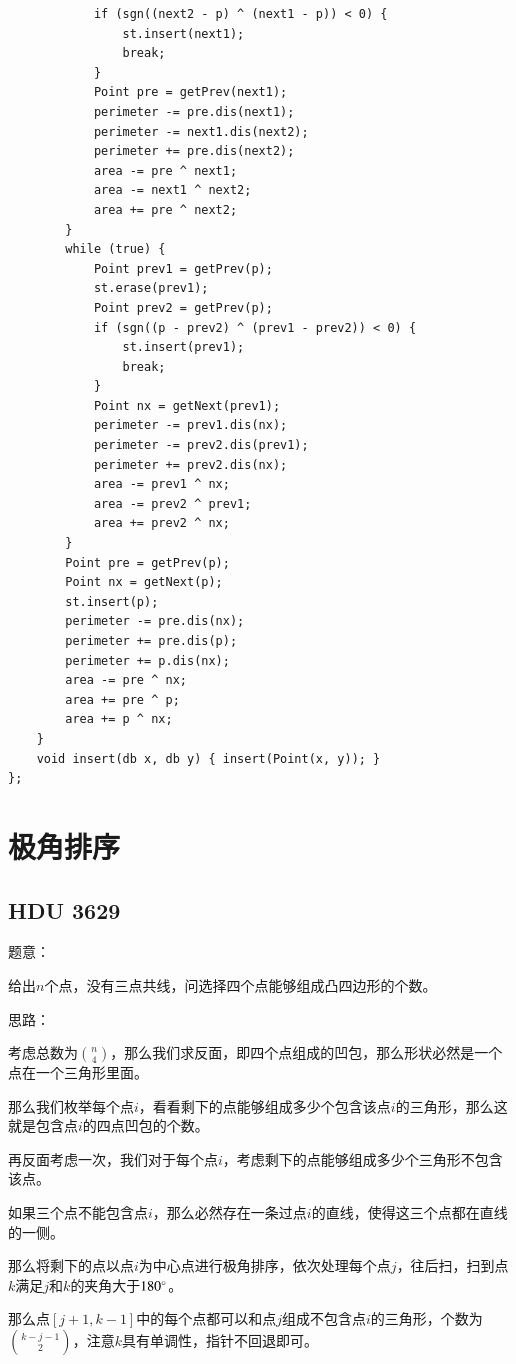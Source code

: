 \begin{lstlisting}
			if (sgn((next2 - p) ^ (next1 - p)) < 0) {
				st.insert(next1);
				break;
			}
			Point pre = getPrev(next1);
			perimeter -= pre.dis(next1);
			perimeter -= next1.dis(next2);
			perimeter += pre.dis(next2);
			area -= pre ^ next1;
			area -= next1 ^ next2;
			area += pre ^ next2;
		}
		while (true) {
			Point prev1 = getPrev(p);
			st.erase(prev1);
			Point prev2 = getPrev(p);
			if (sgn((p - prev2) ^ (prev1 - prev2)) < 0) {
				st.insert(prev1);
				break;
			}
			Point nx = getNext(prev1);
			perimeter -= prev1.dis(nx);
			perimeter -= prev2.dis(prev1);
			perimeter += prev2.dis(nx);
			area -= prev1 ^ nx;
			area -= prev2 ^ prev1;
			area += prev2 ^ nx;
		}
		Point pre = getPrev(p);
		Point nx = getNext(p);
		st.insert(p);
		perimeter -= pre.dis(nx);
		perimeter += pre.dis(p);
		perimeter += p.dis(nx);
		area -= pre ^ nx;
		area += pre ^ p;
		area += p ^ nx;
	}
	void insert(db x, db y) { insert(Point(x, y)); }
};
\end{lstlisting}

\section{极角排序}


\subsection{HDU 3629}

题意：\par
给出$n$个点，没有三点共线，问选择四个点能够组成凸四边形的个数。\par

思路：\par
考虑总数为$\displaystyle n \choose 4$，那么我们求反面，即四个点组成的凹包，那么形状必然是一个点在一个三角形里面。\par
那么我们枚举每个点$i$，看看剩下的点能够组成多少个包含该点$i$的三角形，那么这就是包含点$i$的四点凹包的个数。\par
再反面考虑一次，我们对于每个点$i$，考虑剩下的点能够组成多少个三角形不包含该点。\par

如果三个点不能包含点$i$，那么必然存在一条过点$i$的直线，使得这三个点都在直线的一侧。\par
那么将剩下的点以点$i$为中心点进行极角排序，依次处理每个点$j$，往后扫，扫到点$k$满足$j$和$k$的夹角大于$180 \degree$。\par
那么点$[j + 1, k - 1]$中的每个点都可以和点$j$组成不包含点$i$的三角形，个数为$\displaystyle {k - j - 1 \choose 2}$，注意$k$具有单调性，指针不回退即可。\par

